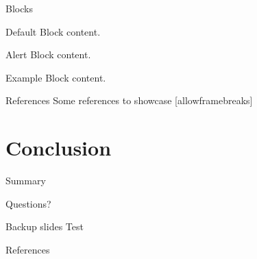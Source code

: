 \documentclass[10pt]{beamer}
\begin{document}
\begin{frame}{Blocks}
 

      \begin{block}{Default}
        Block content.
      \end{block}

      \begin{alertblock}{Alert}
        Block content.
      \end{alertblock}

      \begin{exampleblock}{Example}
        Block content.
      \end{exampleblock}


\end{frame}

\begin{frame}{References}
  Some references to showcase [allowframebreaks] \cite{knuth92,ConcreteMath,Simpson,Er01,greenwade93}
\end{frame}
\section{Conclusion}

\begin{frame}{Summary}

\end{frame}

{
\begin{frame}[standout]
  Questions?
\end{frame}
}

\appendix
\begin{frame}[fragile]{Backup slides}
Test
\end{frame}

\begin{frame}[allowframebreaks]{References}

  
  

\end{frame}
\end{document}
